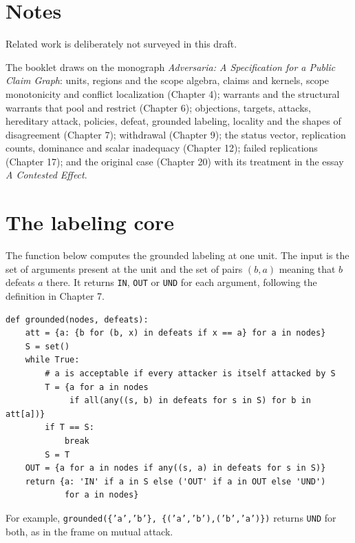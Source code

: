 \documentclass[11pt]{article}
\newcounter{fr}
\newcounter{ex}
\begin{document}
\section*{Notes}


Related work is deliberately not surveyed in this draft.

The booklet draws on the monograph \emph{Adversaria: A Specification for a Public Claim Graph}: units, regions and the scope algebra, claims and kernels, scope monotonicity and conflict localization (Chapter 4); warrants and the structural warrants that pool and restrict (Chapter 6); objections, targets, attacks, hereditary attack, policies, defeat, grounded labeling, locality and the shapes of disagreement (Chapter 7); withdrawal (Chapter 9); the status vector, replication counts, dominance and scalar inadequacy (Chapter 12); failed replications (Chapter 17); and the original case (Chapter 20) with its treatment in the essay \emph{A Contested Effect}.

\appendix
\section{The labeling core}

The function below computes the grounded labeling at one unit. The input is the set of arguments present at the unit and the set of pairs $(b,a)$ meaning that $b$ defeats $a$ there. It returns \texttt{IN}, \texttt{OUT} or \texttt{UND} for each argument, following the definition in Chapter 7.

\begin{small}
\begin{verbatim}
def grounded(nodes, defeats):
    att = {a: {b for (b, x) in defeats if x == a} for a in nodes}
    S = set()
    while True:
        # a is acceptable if every attacker is itself attacked by S
        T = {a for a in nodes
             if all(any((s, b) in defeats for s in S) for b in att[a])}
        if T == S:
            break
        S = T
    OUT = {a for a in nodes if any((s, a) in defeats for s in S)}
    return {a: 'IN' if a in S else ('OUT' if a in OUT else 'UND')
            for a in nodes}
\end{verbatim}
\end{small}

For example, \texttt{grounded(\{'a','b'\}, \{('a','b'),('b','a')\})} returns \texttt{UND} for both, as in the frame on mutual attack.
\end{document}
